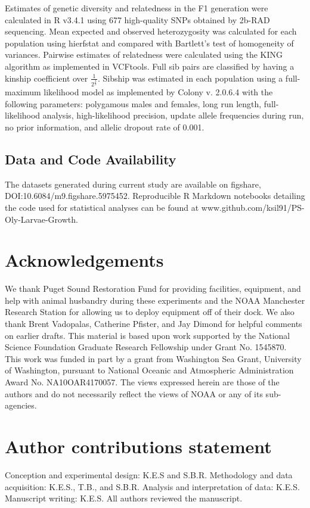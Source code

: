 \documentclass[fleqn,10pt]{wlscirep}
\begin{document}
Estimates of genetic diversity and relatedness in the F1 generation were calculated in R v3.4.1\cite{Rbase} using 677 high-quality SNPs obtained by 2b-RAD sequencing. Mean expected and observed heterozygosity was calculated for each population using hierfstat\cite{hierfstat} and compared with Bartlett's test of homogeneity of variances\cite{Bartlett1937-xt}. Pairwise estimates of relatedness were calculated using the KING algorithm\cite{Manichaikul2010-cs} as implemented in VCFtools\cite{Danecek2011-lh}. Full sib pairs are classified by having a kinship coefficient over \( \frac{1}{2^{\frac{3}{2}}} \). Sibship was estimated in each population using a full-maximum likelihood model as implemented by Colony v. 2.0.6.4 \cite{Wang2009-gs,Wang2004-gx} with the following parameters: polygamous males and females, long run length, full-likelihood analysis, high-likelihood precision, update allele frequencies during run, no prior information, and allelic dropout rate of 0.001.

\subsection*{Data and Code Availability}
The datasets generated during current study are available on figshare, DOI:10.6084/m9.figshare.5975452. Reproducible R Markdown notebooks detailing the code used for statistical analyses can be found at www.github.com/ksil91/PS-Oly-Larvae-Growth.




\section*{Acknowledgements}
We thank Puget Sound Restoration Fund for providing facilities, equipment, and help with animal husbandry during these experiments and the NOAA Manchester Research Station for allowing us to deploy equipment off of their dock. We also thank Brent Vadopalas, Catherine Pfister, and Jay Dimond for helpful comments on earlier drafts. This material is based upon work supported by the National Science Foundation Graduate Research Fellowship under Grant No. 1545870. This work was funded in part by a grant from Washington Sea Grant, University of Washington, pursuant to National Oceanic and Atmospheric Administration Award No. NA10OAR4170057. The views expressed herein are those of the authors and do not necessarily reflect the views of NOAA or any of its sub-agencies.

\section*{Author contributions statement}
Conception and experimental design: K.E.S and S.B.R. Methodology and data acquisition: K.E.S., T.B., and S.B.R. Analysis and interpretation of data: K.E.S. Manuscript writing: K.E.S. All authors reviewed the manuscript. 
\end{document}
